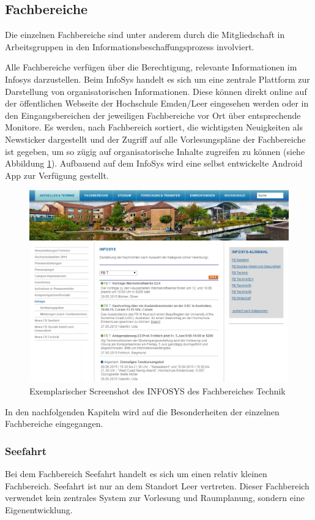 \subsection{Fachbereiche}
Die einzelnen Fachbereiche sind unter anderem durch die Mitgliedschaft in Arbeitsgruppen in den Informationsbeschaffungsprozess involviert.

Alle Fachbereiche verfügen über die Berechtigung, relevante Informationen im Infosys darzustellen. Beim InfoSys handelt es sich um eine zentrale Plattform zur Darstellung von organisatorischen Informationen. Diese können direkt online auf der öffentlichen Webseite der Hochschule Emden/Leer eingesehen werden oder in den Eingangsbereichen der jeweiligen Fachbereiche vor Ort über entsprechende Monitore. Es werden, nach Fachbereich sortiert, die wichtigsten Neuigkeiten als Newsticker dargestellt und der Zugriff auf alle Vorlesungspläne der Fachbereiche ist gegeben, um so zügig auf organisatorische Inhalte zugreifen zu können (siehe Abbildung \ref{fig_InfoSys}). Aufbauend auf dem InfoSys wird eine selbst entwickelte Android App zur Verfügung gestellt.

\begin{figure}[h!]
	\centering
	\includegraphics[width=14cm]{kapitel/gruppe2/bilder/InfoSys}
	\caption{Exemplarischer Screenshot des INFOSYS des Fachbereiches Technik}
	\label{fig_InfoSys}
\end{figure}

In den nachfolgenden Kapiteln wird auf die Besonderheiten der einzelnen Fachbereiche eingegangen.

\subsubsection{Seefahrt}
Bei dem Fachbereich Seefahrt handelt es sich um einen relativ kleinen Fachbereich. Seefahrt ist  nur an dem Standort Leer vertreten. Dieser Fachbereich verwendet kein zentrales System zur Vorlesung und Raumplanung, sondern eine Eigenentwicklung.


